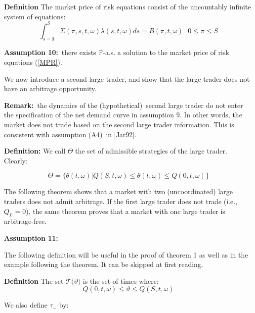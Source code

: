 \documentclass{article}
\begin{document}
\textbf{Definition }The market price of risk equations consist of the
uncountably infinite system of equations: 
\begin{equation}
\int_{s=0}^{S}\Sigma (\pi ,s,t,\omega )\lambda (s,t,\omega )ds=B(\pi
,t,\omega )\text{ \ \ \ \ \ }0\leq \pi \leq S  \label{MPR}
\end{equation}

\textbf{Assumption 10:}\ there exists $\mathbb{P}$-a.s. a solution to the
market price of risk equations (\ref{MPR}).

\bigskip

We now introduce a second large trader, and show that the large trader does
not have an arbitrage opportunity.

\bigskip

\textbf{Remark:}\ the dynamics of the (hypothetical)\ second large trader do
not enter the specification of the net demand curve in assumption 9. In
other words, the market does not trade based on the second large trader
information. This is consistent with assumption (A4)\ in [Jar92].

\bigskip

\textbf{Definition:} We call $\Theta $ the set of admissible strategies of
the large trader. Clearly:

\begin{equation*}
\Theta =\{\theta (t,\omega )|Q(S,t,\omega )\leq \theta (t,\omega )\leq
Q(0,t,\omega )\}
\end{equation*}

The following theorem shows that a market with two (uncoordinated) large
traders does not admit arbitrage. If the first large trader does not trade
(i.e., $Q_{L}=0$), the same theorem proves that a market with one large
trader is arbitrage-free.

\bigskip

\textbf{Assumption 11:}

\bigskip

The following definition will be useful in the proof of theorem 1 as well as
in the example following the theorem. It can be skipped at first reading.

\bigskip

\textbf{Definition} The set $\mathcal{T(}\vartheta )$ is the set of times
where:%
\begin{equation*}
Q(0,t,\omega )\leq \vartheta \leq Q(S,t,\omega )
\end{equation*}

We also define $\tau _{-}$ by:
\end{document}

